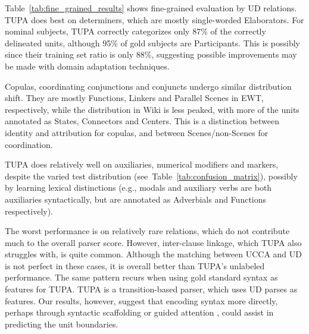 \documentclass[11pt,a4paper]{article}
\begin{document}
Table~\ref{tab:fine_grained_results} shows
fine-grained evaluation by UD relations.
TUPA does best on determiners, which are mostly single-worded Elaborators.
For nominal subjects,
TUPA correctly categorizes only 87\% of the correctly delineated units,
although 95\% of gold subjects are Participants.
This is possibly since their training set ratio is only 88\%,
suggesting possible improvements may be made with domain adaptation techniques.

Copulas, coordinating conjunctions and conjuncts
undergo similar distribution shift.
They are mostly Functions, Linkers and Parallel Scenes in EWT, respectively,
while the distribution in Wiki is less peaked, with more of the units annotated as
States, Connectors and Centers.
This is a distinction between identity and attribution for copulas,
and between Scenes/non-Scenes for coordination.

TUPA does relatively well on auxiliaries, numerical modifiers and markers,
despite the varied test distribution (see~Table~\ref{tab:confusion_matrix}),
possibly by learning lexical distinctions
(e.g., modals and auxiliary verbs are both auxiliaries syntactically,
but are annotated as Adverbials and Functions respectively).

The worst performance is on relatively rare relations,
which do not contribute much to the overall parser score.
However, inter-clause linkage, which TUPA also struggles with, is quite common.
Although the matching between UCCA and UD is not perfect in these cases,
it is overall better than TUPA's unlabeled performance.
The same pattern recurs when using gold standard syntax as features for TUPA.
TUPA is a transition-based parser, which uses UD parses as features. Our
results, however, suggest that encoding syntax more directly, perhaps through syntactic
scaffolding \citep{swayamdipta2018syntactic}
or guided attention \cite{strubell2018linguistically},
could assist in predicting the unit boundaries.
\end{document}
